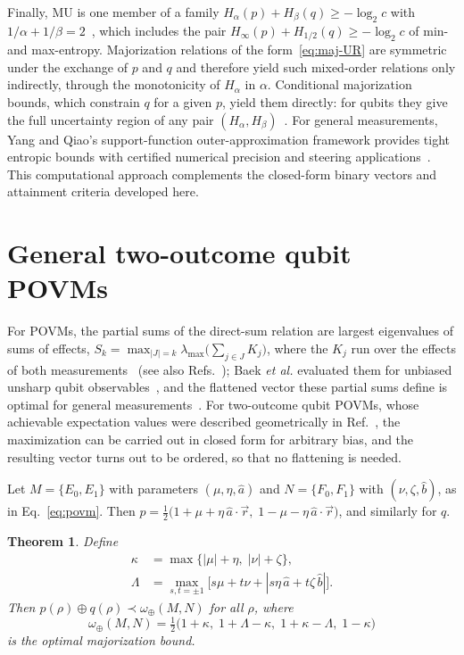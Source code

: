 \documentclass[aps,pra,twocolumn,superscriptaddress,nofootinbib,floatfix]{revtex4-2}
\newtheorem{theorem}{Theorem}
\theoremstyle{definition}
\newcommand{\vecr}{\vec r}
\newcommand{\maj}{\prec}
\newcommand{\omplus}{\omega_{\oplus}}
\begin{document}
Finally, MU is one member of a family $H_\alpha(p)+H_\beta(q)\ge-\log_2c$ with
$1/\alpha+1/\beta=2$~\cite{MaassenUffink1988}, which includes the pair
$H_\infty(p)+H_{1/2}(q)\ge-\log_2c$ of min- and max-entropy. Majorization
relations of the form~\eqref{eq:maj-UR} are symmetric under the exchange of $p$
and $q$ and therefore yield such mixed-order relations only indirectly, through
the monotonicity of $H_\alpha$ in $\alpha$. Conditional majorization bounds,
which constrain $q$ for a given $p$, yield them directly: for qubits they give
the full uncertainty region of any pair $(H_\alpha,H_\beta)$~\cite{XiaoFangGour2019}.
For general measurements, Yang and Qiao's support-function outer-approximation
framework provides tight entropic bounds with certified numerical precision and
steering applications~\cite{YangQiaoOptimization2026}. This computational
approach complements the closed-form binary vectors and attainment criteria
developed here.

\section{General two-outcome qubit POVMs}
\label{sec:povm}

For POVMs, the partial sums of the direct-sum relation are largest eigenvalues
of sums of effects, $S_k=\max_{|J|=k}\lambda_{\max}\bigl(\sum_{j\in J}K_j\bigr)$,
where the $K_j$ run over the effects of both
measurements~\cite{Baek2019} (see also
Refs.~\cite{RPZ2014,RasteginZyczkowski2016,Bosyk2014}); Baek \emph{et al.}
evaluated them for unbiased unsharp qubit observables~\cite{Baek2019}, and
the flattened vector these partial sums define is optimal for general
measurements~\cite{Yuan2023}. For two-outcome qubit POVMs, whose achievable
expectation values were described geometrically in Ref.~\cite{Abbott2016}, the
maximization can be carried out in closed form for arbitrary bias, and the
resulting vector turns out to be ordered, so that no flattening is needed.

Let $M=\{E_0,E_1\}$ with parameters $(\mu,\eta,\hat a)$ and $N=\{F_0,F_1\}$ with
$(\nu,\zeta,\hat b)$, as in Eq.~\eqref{eq:povm}. Then
$p=\frac12\bigl(1+\mu+\eta\,\hat a\cdot\vecr,\;1-\mu-\eta\,\hat a\cdot\vecr\bigr)$, and
similarly for $q$.

\begin{theorem}
\label{thm:povm}
Define
\begin{align}
  \kappa&=\max\{|\mu|+\eta,\;|\nu|+\zeta\},\\
  \Lambda&=\max_{s,t=\pm1}\bigl[s\mu+t\nu+|s\eta\,\hat a+t\zeta\,\hat b|\bigr].
\end{align}
Then $p(\rho)\oplus q(\rho)\maj\omplus(M,N)$ for all $\rho$, where
\begin{equation}
  \omplus(M,N)=\tfrac12\bigl(1+\kappa,\;1+\Lambda-\kappa,\;1+\kappa-\Lambda,\;1-\kappa\bigr)
  \label{eq:om-povm}
\end{equation}
is the optimal majorization bound.
\end{theorem}
\end{document}
